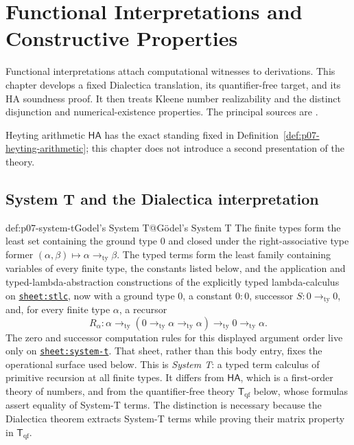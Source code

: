 
\chapter{Functional Interpretations and Constructive Properties}
\label{sec:p07-functional-interpretations}

Functional interpretations attach computational witnesses to derivations.
This chapter develops a fixed Dialectica translation, its quantifier-free
target, and its HA soundness proof. It then treats Kleene number realizability
and the distinct disjunction and numerical-existence properties.  The principal sources are
\cite{Godel1958,Troelstra1973,AvigadFeferman1998,Kleene1945,
Troelstra1998,TroelstraVanDalen1988}.

Heyting arithmetic \(\mathsf{HA}\) has the exact standing fixed in
Definition~\ref{def:p07-heyting-arithmetic}; this chapter does not introduce a
second presentation of the theory.

\section{System T and the Dialectica interpretation}
\label{sec:p07-dialectica}

\begin{hbdefinition}{def:p07-system-t}{Godel's System T@G\"odel's System T}
The finite types form the least set containing the ground type \(0\) and
closed under the right-associative type former
\((\alpha,\beta)\mapsto\alpha\to_{\mathrm{ty}}\beta\).  The typed terms form
the least family containing variables of every finite type, the constants
listed below, and the application and typed-lambda-abstraction constructions
of the explicitly typed lambda-calculus on
\hyperref[sheet:stlc]{\texttt{sheet:stlc}}, now with a ground type \(0\), a
constant \(0:0\), successor \(S:0\to_{\mathrm{ty}}0\), and, for every finite type
\(\alpha\), a recursor
\[
 R_\alpha:
 \alpha\to_{\mathrm{ty}}
 (0\to_{\mathrm{ty}}\alpha\to_{\mathrm{ty}}\alpha)
 \to_{\mathrm{ty}}0\to_{\mathrm{ty}}\alpha.
\]
The zero and successor computation rules for this displayed argument order
live only on \hyperref[sheet:system-t]{\texttt{sheet:system-t}}.  That sheet,
rather than this body entry, fixes the operational surface used below.
This is \emph{System T}: a typed term calculus of primitive recursion at all
finite types.  It differs from \(\mathsf{HA}\), which is a first-order theory
of numbers, and from the quantifier-free theory \(\mathsf T_{\mathrm{qf}}\)
below, whose
formulas assert equality of System-T terms.  The distinction is necessary
because the Dialectica theorem extracts System-T terms while proving their
matrix property in \(\mathsf T_{\mathrm{qf}}\).
\end{hbdefinition}

